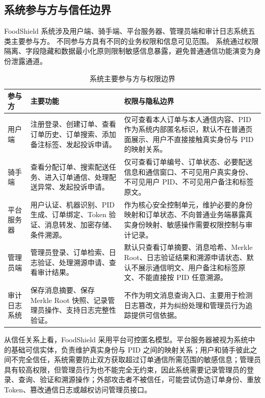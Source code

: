 \subsection{系统参与方与信任边界}

FoodShield 系统涉及用户端、骑手端、平台服务器、管理员端和审计日志系统五类主要参与方。
不同参与方具有不同的业务权限和信息可见范围。
系统通过权限隔离、字段隐藏和数据最小化原则限制敏感信息暴露，避免普通通信功能演变为身份泄露通道。

\begin{table}[H]
\centering
\caption{系统主要参与方与权限边界}
\renewcommand{\arraystretch}{1.55}
\setlength{\tabcolsep}{5pt}

\begin{tabular}{L{2.2cm} L{4.7cm} L{6.7cm}}
\toprule
\textbf{参与方} & \textbf{主要功能} & \textbf{权限与隐私边界} \\
\midrule

用户端
&
注册登录、创建订单、查看订单历史、订单搜索、添加备注标签、发起投诉申请。
&
仅可查看本人订单与本人通信内容、PID 作为系统内部匿名标识，默认不在普通页面展示、用户不直接接触真实身份与 PID 的映射关系。
\\

骑手端
&
查看分配订单、搜索配送任务、进入订单通信、处理配送异常、发起投诉申请。
&
仅可查看订单编号、订单状态、必要配送信息和通信窗口、不可见用户真实身份、不可见用户 PID、不可见用户备注和标签原文。
\\

平台服务器
&
用户认证、机器识别、PID 生成、订单绑定、Token 验证、消息转发、加密存储、条件溯源。
&
作为核心安全控制单元，维护必要的身份映射和订单状态、不向普通业务端暴露真实身份映射、敏感操作需要权限控制与审计记录。
\\

管理员端
&
管理员登录、订单检索、日志验证、处理溯源申请、查看审计结果。
&
默认只查看订单摘要、消息哈希、Merkle Root、日志验证结果和溯源申请状态、默认不展示通信明文、用户备注和标签原文、不能直接按 PID 任意溯源。
\\

审计日志系统
&
保存消息摘要、保存 Merkle Root 快照、记录管理员操作、支持日志完整性验证。
&
不作为明文消息查询入口、主要用于检测日志篡改，并为纠纷处理和管理员行为追踪提供可信依据。
\\

\bottomrule
\end{tabular}
\end{table}


从信任关系上看，FoodShield 采用平台可控匿名模型。平台服务器被视为系统中的基础可信实体，负责维护真实身份与 PID 之间的映射关系；用户和骑手彼此之间不完全信任，系统需要防止双方获取超过订单通信所需范围的敏感信息；管理员具有较高权限，但管理员行为也不能完全无约束，因此系统需要记录管理员的登录、查询、验证和溯源操作；外部攻击者不被信任，可能尝试伪造订单身份、重放 Token、篡改通信日志或越权访问管理员接口。


